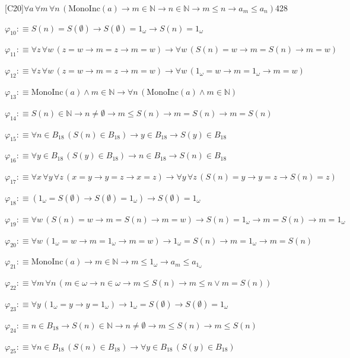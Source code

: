 \begin{fullproof}{[C20]}{$\forall a\,\forall m\,\forall n\,(\mathrm{MonoInc}(a) \to m \in \mathbb{N} \to n \in \mathbb{N} \to m \leq n \to a_{m} \leq a_{n})$}{428}
\begin{abbrevlist}
\item $\varphi_{10} :\equiv S(n) = S(\emptyset) \to S(\emptyset) = 1_{\omega} \to S(n) = 1_{\omega}$
\item $\varphi_{11} :\equiv \forall z\,\forall w\,(z = w \to m = z \to m = w) \to \forall w\,(S(n) = w \to m = S(n) \to m = w)$
\item $\varphi_{12} :\equiv \forall z\,\forall w\,(z = w \to m = z \to m = w) \to \forall w\,(1_{\omega} = w \to m = 1_{\omega} \to m = w)$
\item $\varphi_{13} :\equiv \mathrm{MonoInc}(a) \land m \in \mathbb{N} \to \forall n\,(\mathrm{MonoInc}(a) \land m \in \mathbb{N})$
\item $\varphi_{14} :\equiv S(n) \in \mathbb{N} \to n \neq \emptyset \to m \leq S(n) \to m = S(n) \to m = S(n)$
\item $\varphi_{15} :\equiv \forall n \in B_{18}\,(S(n) \in B_{18}) \to y \in B_{18} \to S(y) \in B_{18}$
\item $\varphi_{16} :\equiv \forall y \in B_{18}\,(S(y) \in B_{18}) \to n \in B_{18} \to S(n) \in B_{18}$
\item $\varphi_{17} :\equiv \forall x\,\forall y\,\forall z\,(x = y \to y = z \to x = z) \to \forall y\,\forall z\,(S(n) = y \to y = z \to S(n) = z)$
\item $\varphi_{18} :\equiv (1_{\omega} = S(\emptyset) \to S(\emptyset) = 1_{\omega}) \to S(\emptyset) = 1_{\omega}$
\item $\varphi_{19} :\equiv \forall w\,(S(n) = w \to m = S(n) \to m = w) \to S(n) = 1_{\omega} \to m = S(n) \to m = 1_{\omega}$
\item $\varphi_{20} :\equiv \forall w\,(1_{\omega} = w \to m = 1_{\omega} \to m = w) \to 1_{\omega} = S(n) \to m = 1_{\omega} \to m = S(n)$
\item $\varphi_{21} :\equiv \mathrm{MonoInc}(a) \to m \in \mathbb{N} \to m \leq 1_{\omega} \to a_{m} \leq a_{1_{\omega}}$
\item $\varphi_{22} :\equiv \forall m\,\forall n\,(m \in \omega \to n \in \omega \to m \leq S(n) \to m \leq n \lor m = S(n))$
\item $\varphi_{23} :\equiv \forall y\,(1_{\omega} = y \to y = 1_{\omega}) \to 1_{\omega} = S(\emptyset) \to S(\emptyset) = 1_{\omega}$
\item $\varphi_{24} :\equiv n \in B_{18} \to S(n) \in \mathbb{N} \to n \neq \emptyset \to m \leq S(n) \to m \leq S(n)$
\item $\varphi_{25} :\equiv \forall n \in B_{18}\,(S(n) \in B_{18}) \to \forall y \in B_{18}\,(S(y) \in B_{18})$

\end{abbrevlist}
\end{fullproof}
